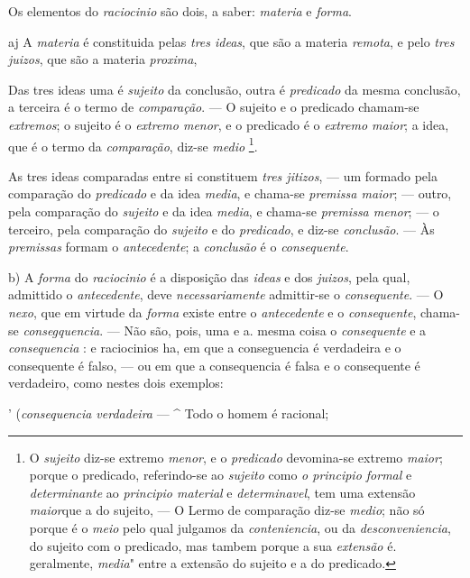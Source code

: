 
Os elementos do \emph{raciocinio} são dois, a saber: \emph{materia} e \emph{forma}.

aj A \emph{materia} é constituida pelas \emph{tres ideas}, que são a materia \emph{remota}, e pelo \emph{tres juizos}, que são a materia \emph{proxima},

Das tres ideas uma é \emph{sujeito} da conclusão, outra é \emph{predicado} da mesma conclusão, a terceira é o termo de \emph{comparação}. --- O sujeito e o predicado chamam-se \emph{extremos}; o sujeito é o \emph{extremo menor}, e o predicado é o \emph{extremo maior}; a idea, que é o termo da \emph{comparação}, diz-se \emph{medio} \footnote{O \emph{sujeito} diz-se extremo \emph{menor}, e o \emph{predicado} devomina-se extremo \emph{maior}; porque o predicado, referindo-se ao \emph{sujeito} como \emph{o principio formal} e \emph{determinante} ao \emph{principio material} e \emph{determinavel}, tem uma extensão \emph{maior}que a do sujeito, --- O Lermo de comparação diz-se \emph{medio}; não só porque é o \emph{meio} pelo qual julgamos da \emph{conteniencia}, ou da \emph{desconveniencia}, do sujeito com o predicado, mas tambem porque a sua \emph{extensão} é. geralmente, \emph{media}" entre a extensão do sujeito e a do predicado.}.

As tres ideas comparadas entre si constituem \emph{tres jitizos}, --- um formado pela comparação do \emph{predicado} e da idea \emph{media}, e chama-se \emph{premissa maior}; --- outro, pela comparação do \emph{sujeito} e da idea \emph{media}, e chama-se \emph{premissa menor}; --- o terceiro, pela comparação do \emph{sujeito} e do \emph{predicado}, e diz-se \emph{conclusão}. --- Às \emph{premissas} formam o \emph{antecedente}; a \emph{conclusão} é o \emph{consequente}.

b) A \emph{forma} do \emph{raciocinio} é a disposição das \emph{ideas} e dos \emph{juizos}, pela qual, admittido o \emph{antecedente}, deve \emph{necessariamente} admittir-se o \emph{consequente}. --- O \emph{nexo}, que em virtude da \emph{forma} existe entre o \emph{antecedente} e o \emph{consequente}, chama-se \emph{consegquencia}. --- Não são, pois, uma e a. mesma coisa o \emph{consequente} e a \emph{consequencia} : e raciocinios ha, em que a conseguencia é verdadeira e o consequente é falso, --- ou em que a consequencia é falsa e o consequente é verdadeiro, como nestes dois exemplos:

' (\emph{consequencia verdadeira} --- \textasciicircum{} Todo o homem é racional;

